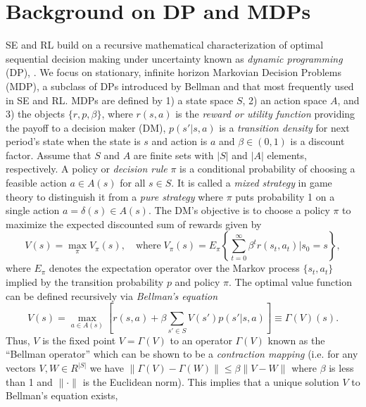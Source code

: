 

\section{Background on DP and MDPs\label{sec:mdp}}

SE and RL build on a recursive mathematical characterization of optimal sequential decision
making under uncertainty known as  {\it dynamic programming\/} (DP), \citet{Bellman:1957}. We focus 
on stationary, infinite horizon Markovian Decision Problems (MDP), a subclass of DPs introduced by Bellman and \citet{Howard:1960} that 
most frequently used in SE and RL.
MDPs are defined by  1) a state space $S$, 2) an action space $A$, and  3) the objects  $\{r,p,\beta\}$, where $r(s,a)$ is the {\it reward or utility function\/}
providing the payoff to a decision maker (DM), $p(s'|s,a)$ is a {\it transition density\/} for next period's state when the state is $s$ and action is $a$
and $\beta \in (0,1)$ is a discount factor.  Assume
that  $S$ and $A$ are finite sets with $|S|$ and $|A|$ elements, respectively.
A policy or {\it decision rule\/} $\pi$ is a conditional probability of choosing 
a feasible action $a \in A(s)$ for all $s \in S$. It is called a {\it mixed strategy\/} in game theory  to 
distinguish it from a {\it pure strategy\/} where $\pi$ puts probability 1 
on a single action  $a=\delta(s) \in A(s)$.  The DM's objective is to choose a policy
$\pi$ to maximize the expected discounted sum of rewards given by
\begin{equation}
       V(s)= \max_\pi  V_\pi(s),  \quad \mbox{where} \;  V_\pi(s) = E_\pi \left\{\sum_{t=0}^\infty \beta^t r(s_t,a_t)| s_0=s\right\},
\label{eq:vdef}
\end{equation}
where $E_\pi$ denotes the expectation operator over the Markov process $\{s_t,a_t\}$ implied by the transition probability $p$ and policy $\pi$.
The optimal value function can be defined recursively \citep{Bellman:1957} via {\it Bellman's equation\/}
\begin{equation}
            V(s) = \max_{a \in A(s)}\left[ r(s,a)+ \beta \sum_{s' \in S} V(s')p(s'|s,a)\right] \equiv \Gamma(V)(s).
\label{eq:bellman}
\end{equation}
Thus, $V$ is the fixed point $V=\Gamma(V)$ to an operator $\Gamma(V)$ known as the ``Bellman operator'' 
which can be shown to be a {\it contraction mapping\/} 
(i.e. for any vectors $V,W \in R^{|S|}$ we have $\|\Gamma(V)-\Gamma(W)\| \le \beta \|V-W\|$ where $\beta$ is less than 1
and $\|\cdot\|$ is the Euclidean norm). This implies that a  unique solution $V$ to Bellman's equation exists, 
